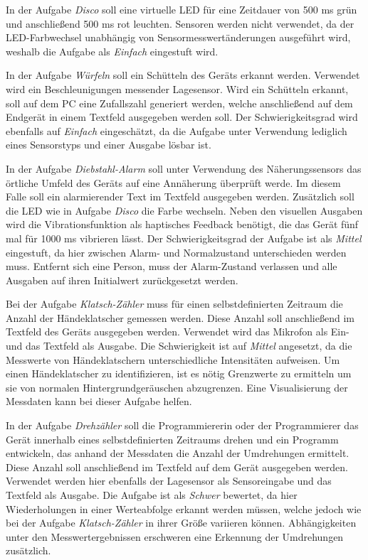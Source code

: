 \documentclass[11pt,a4paper]{report}
\begin{document}
In der Aufgabe \textit{Disco} soll eine virtuelle LED für eine Zeitdauer von 500 ms grün und anschließend 500 ms rot leuchten.
Sensoren werden nicht verwendet, da der LED-Farbwechsel unabhängig von Sensormesswertänderungen ausgeführt wird, weshalb die Aufgabe als \textit{Einfach} eingestuft wird.

In der Aufgabe \textit{Würfeln} soll ein Schütteln des Geräts erkannt werden.
Verwendet wird ein Beschleunigungen messender Lagesensor.
Wird ein Schütteln erkannt, soll auf dem PC eine Zufallszahl generiert werden, welche anschließend auf dem Endgerät in einem Textfeld ausgegeben werden soll.
Der Schwierigkeitsgrad wird ebenfalls auf \textit{Einfach} eingeschätzt, da die Aufgabe unter Verwendung lediglich eines Sensorstyps und einer Ausgabe lösbar ist.

In der Aufgabe \textit{Diebstahl-Alarm} soll unter Verwendung des Näherungssensors das örtliche Umfeld des Geräts auf eine Annäherung überprüft werde.
Im diesem Falle soll ein alarmierender Text im Textfeld ausgegeben werden.
Zusätzlich soll die LED wie in Aufgabe \textit{Disco} die Farbe wechseln.
Neben den visuellen Ausgaben wird die Vibrationsfunktion als haptisches Feedback benötigt, die das Gerät fünf mal für 1000 ms vibrieren lässt.
Der Schwierigkeitsgrad der Aufgabe ist als \textit{Mittel} eingestuft, da hier zwischen Alarm- und Normalzustand unterschieden werden muss.
Entfernt sich eine Person, muss der Alarm-Zustand verlassen und alle Ausgaben auf ihren Initialwert zurückgesetzt werden.

Bei der Aufgabe \textit{Klatsch-Zähler} muss für einen selbstdefinierten Zeitraum die Anzahl der Händeklatscher gemessen werden.
Diese Anzahl soll anschließend im Textfeld des Geräts ausgegeben werden.
Verwendet wird das Mikrofon als Ein- und das Textfeld als Ausgabe.
Die Schwierigkeit ist auf \textit{Mittel} angesetzt, da die Messwerte von Händeklatschern unterschiedliche Intensitäten aufweisen.
Um einen Händeklatscher zu identifizieren, ist es nötig Grenzwerte zu ermitteln um sie von normalen Hintergrundgeräuschen abzugrenzen.
Eine Visualisierung der Messdaten kann bei dieser Aufgabe helfen.

In  der Aufgabe \textit{Drehzähler} soll die Programmiererin oder der Programmierer das Gerät innerhalb eines selbstdefinierten Zeitraums drehen und ein Programm entwickeln, das anhand der Messdaten die Anzahl der Umdrehungen ermittelt.
Diese Anzahl soll anschließend im Textfeld auf dem Gerät ausgegeben werden.
Verwendet werden hier ebenfalls der Lagesensor als Sensoreingabe und das Textfeld als Ausgabe.
Die Aufgabe ist als \textit{Schwer} bewertet, da hier Wiederholungen in einer Werteabfolge erkannt werden müssen, welche jedoch wie bei der Aufgabe \textit{Klatsch-Zähler} in ihrer Größe variieren können.
Abhängigkeiten unter den Messwertergebnissen erschweren eine Erkennung der Umdrehungen zusätzlich.
\end{document}
